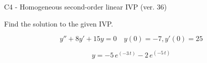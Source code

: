 \begin{exercise}
  \begin{exerciseTitle}C4 - Homogeneous second-order linear IVP (ver. 36)\end{exerciseTitle}
  \begin{exerciseStatement}
    
Find the solution to the given IVP.

    
\[y''+8y'+15y = 0 \hspace{1em} y(0) = -7 , y'(0) = 25\]

  \end{exerciseStatement}
  \begin{exerciseAnswer}
    
\[y= -5 \, e^{\left(-3 \, t\right)} - 2 \, e^{\left(-5 \, t\right)}\]

  \end{exerciseAnswer}
\end{exercise}